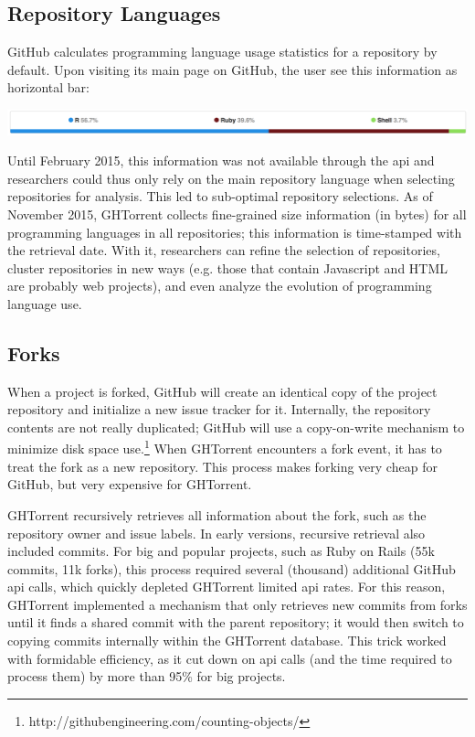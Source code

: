 \documentclass{sig-alternate}
\begin{document}
\subsection{Repository Languages}
GitHub calculates programming language usage statistics for a
repository by default. Upon visiting its main page on GitHub, the user see this
information as horizontal bar:

\noindent\includegraphics[scale=0.243]{languages}

Until February 2015, this information was not available through the {\sc api}
and researchers could thus only rely on the main repository language when
selecting repositories for analysis. This led to sub-optimal repository
selections. As of November 2015, GHTorrent collects fine-grained size
information (in bytes) for all programming languages in all repositories; this
information is time-stamped with the retrieval date. With it,
researchers can refine the selection of repositories, cluster repositories in
new ways (e.g. those that contain Javascript and HTML are probably web
projects), and even analyze the evolution of programming language use.

\subsection{Forks}

When a project is forked, GitHub will create an identical copy of the project
repository and initialize a new issue tracker for it. Internally, the repository
contents are not really duplicated; GitHub will use a copy-on-write mechanism to
minimize disk space
use.\footnote{http://githubengineering.com/counting-objects/} When GHTorrent
encounters a fork event, it has to treat the fork as a new repository. This
process makes forking very cheap for GitHub, but very expensive for GHTorrent.

GHTorrent recursively retrieves all information about the fork, such as the
repository owner and issue labels. In early versions, recursive
retrieval also included commits. For big and popular projects, such as Ruby on
Rails (55k commits, 11k forks), this process required several (thousand)
additional GitHub {\sc api} calls, which quickly depleted GHTorrent limited {\sc
api} rates. For this reason, GHTorrent implemented a mechanism that only
retrieves new commits from forks until it finds a shared commit with the parent
repository; it would then switch to copying commits internally within the
GHTorrent database. This trick worked with formidable efficiency, as it cut down
on {\sc api} calls (and the time required to process them) by more than 95\% for
big projects.
\end{document}

